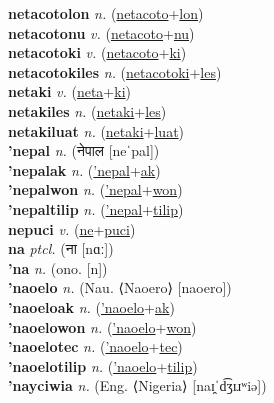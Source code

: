 \textbf{netacotolon} \textit{n.} (\hyperref[netacoto]{netacoto}+\hyperref[lon]{lon})
 \label{netacotolon} \\
\textbf{netacotonu} \textit{v.} (\hyperref[netacoto]{netacoto}+\hyperref[nu]{nu})
 \label{netacotonu} \\
\textbf{netacotoki} \textit{v.} (\hyperref[netacoto]{netacoto}+\hyperref[ki]{ki})
 \label{netacotoki} \\
\textbf{netacotokiles} \textit{n.} (\hyperref[netacotoki]{netacotoki}+\hyperref[les]{les})
 \label{netacotokiles} \\
\textbf{netaki} \textit{v.} (\hyperref[neta]{neta}+\hyperref[ki]{ki})
 \label{netaki} \\
\textbf{netakiles} \textit{n.} (\hyperref[netaki]{netaki}+\hyperref[les]{les})
 \label{netakiles} \\
\textbf{netakiluat} \textit{n.} (\hyperref[netaki]{netaki}+\hyperref[luat]{luat})
 \label{netakiluat} \\
\textbf{'nepal} \textit{n.} ({\devanagari{}नेपाल} [neˈpal])
 \label{'nepal} \\
\textbf{'nepalak} \textit{n.} (\hyperref['nepal]{'nepal}+\hyperref[ak]{ak})
 \label{'nepalak} \\
\textbf{'nepalwon} \textit{n.} (\hyperref['nepal]{'nepal}+\hyperref[won]{won})
 \label{'nepalwon} \\
\textbf{'nepaltilip} \textit{n.} (\hyperref['nepal]{'nepal}+\hyperref[tilip]{tilip})
 \label{'nepaltilip} \\
\textbf{nepuci} \textit{v.} (\hyperref[ne]{ne}+\hyperref[puci]{puci})
 \label{nepuci} \\
\textbf{na} \textit{ptcl.} ({\devanagari{}ना} [nɑː])
 \label{na} \\
\textbf{'na} \textit{n.} (ono. [n])
 \label{'na} \\
\textbf{'naoelo} \textit{n.} (Nau. ⟨Naoero⟩ [naoero])
 \label{'naoelo} \\
\textbf{'naoeloak} \textit{n.} (\hyperref['naoelo]{'naoelo}+\hyperref[ak]{ak})
 \label{'naoeloak} \\
\textbf{'naoelowon} \textit{n.} (\hyperref['naoelo]{'naoelo}+\hyperref[won]{won})
 \label{'naoelowon} \\
\textbf{'naoelotec} \textit{n.} (\hyperref['naoelo]{'naoelo}+\hyperref[tec]{tec})
 \label{'naoelotec} \\
\textbf{'naoelotilip} \textit{n.} (\hyperref['naoelo]{'naoelo}+\hyperref[tilip]{tilip})
 \label{'naoelotilip} \\
\textbf{'nayciwia} \textit{n.} (Eng. ⟨Nigeria⟩ [naɪ̯ˈd͡ʒɪɹʷiə])
